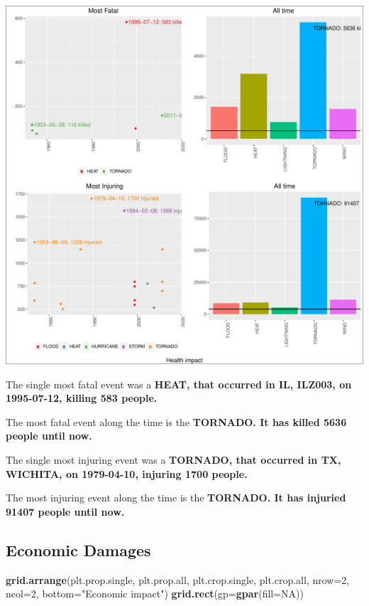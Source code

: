 \documentclass[]{article}
\newenvironment{Shaded}{\begin{snugshade}}{\end{snugshade}}
\newcommand{\KeywordTok}[1]{\textcolor[rgb]{0.13,0.29,0.53}{\textbf{{#1}}}}
\newcommand{\DataTypeTok}[1]{\textcolor[rgb]{0.13,0.29,0.53}{{#1}}}
\newcommand{\DecValTok}[1]{\textcolor[rgb]{0.00,0.00,0.81}{{#1}}}
\newcommand{\StringTok}[1]{\textcolor[rgb]{0.31,0.60,0.02}{{#1}}}
\newcommand{\OtherTok}[1]{\textcolor[rgb]{0.56,0.35,0.01}{{#1}}}
\newcommand{\NormalTok}[1]{{#1}}
\begin{document}
\includegraphics{readme_files/figure-latex/health-plot-1.pdf}

The single most fatal event was a \textbf{HEAT, that occurred in IL,
ILZ003, on 1995-07-12, killing 583 people.}

The most fatal event along the time is the \textbf{TORNADO. It has
killed 5636 people until now.}

The single most injuring event was a \textbf{TORNADO, that occurred in
TX, WICHITA, on 1979-04-10, injuring 1700 people.}

The most injuring event along the time is the \textbf{TORNADO. It has
injuried 91407 people until now.}

\subsection{Economic Damages}\label{economic-damages}

\begin{Shaded}
\begin{Highlighting}[]
\KeywordTok{grid.arrange}\NormalTok{(plt.prop.single, plt.prop.all,}
             \NormalTok{plt.crop.single, plt.crop.all,}
             \DataTypeTok{nrow=}\DecValTok{2}\NormalTok{, }\DataTypeTok{ncol=}\DecValTok{2}\NormalTok{,}
             \DataTypeTok{bottom=}\StringTok{"Economic impact"}\NormalTok{)}
\KeywordTok{grid.rect}\NormalTok{(}\DataTypeTok{gp=}\KeywordTok{gpar}\NormalTok{(}\DataTypeTok{fill=}\OtherTok{NA}\NormalTok{))}
\end{Highlighting}
\end{Shaded}
\end{document}
